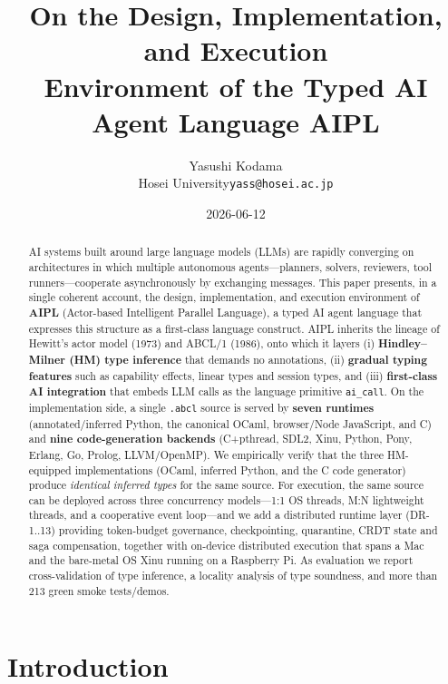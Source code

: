 \documentclass[11pt,a4paper]{article}
\title{\bfseries On the Design, Implementation, and Execution\\
  Environment of the Typed AI Agent Language AIPL}
\author{Yasushi Kodama\\[2pt]
  {\small Hosei University\quad\texttt{yass@hosei.ac.jp}}}
\date{2026-06-12}
\newcommand{\code}[1]{\texttt{\small #1}}
\begin{document}
\maketitle

\begin{abstract}
AI systems built around large language models (LLMs) are rapidly
converging on architectures in which multiple autonomous
agents---planners, solvers, reviewers, tool runners---cooperate
asynchronously by exchanging messages.
This paper presents, in a single coherent account, the design,
implementation, and execution environment of \textbf{AIPL}
(Actor-based Intelligent Parallel Language), a typed AI agent
language that expresses this structure as a first-class language
construct. AIPL inherits the lineage of Hewitt's actor model (1973)
and ABCL/1 (1986), onto which it layers (i) \textbf{Hindley--Milner
(HM) type inference} that demands no annotations, (ii) \textbf{gradual
typing features} such as capability effects, linear types and session
types, and (iii) \textbf{first-class AI integration} that embeds LLM
calls as the language primitive \code{ai\_call}.
On the implementation side, a single \code{.abcl} source is served by
\textbf{seven runtimes} (annotated/inferred Python, the canonical
OCaml, browser/Node JavaScript, and C) and \textbf{nine code-generation
backends} (C+pthread, SDL2, Xinu, Python, Pony, Erlang, Go, Prolog,
LLVM/OpenMP). We empirically verify that the three HM-equipped
implementations (OCaml, inferred Python, and the C code generator)
produce \emph{identical inferred types} for the same source.
For execution, the same source can be deployed across three concurrency
models---1:1 OS threads, M:N lightweight threads, and a cooperative
event loop---and we add a distributed runtime layer (DR-1..13) providing
token-budget governance, checkpointing, quarantine, CRDT state and saga
compensation, together with on-device distributed execution that spans
a Mac and the bare-metal OS Xinu running on a Raspberry Pi.
As evaluation we report cross-validation of type inference, a locality
analysis of type soundness, and more than 213 green smoke tests/demos.
\end{abstract}

\tableofcontents
\vspace{1em}

\section{Introduction}
\end{document}
